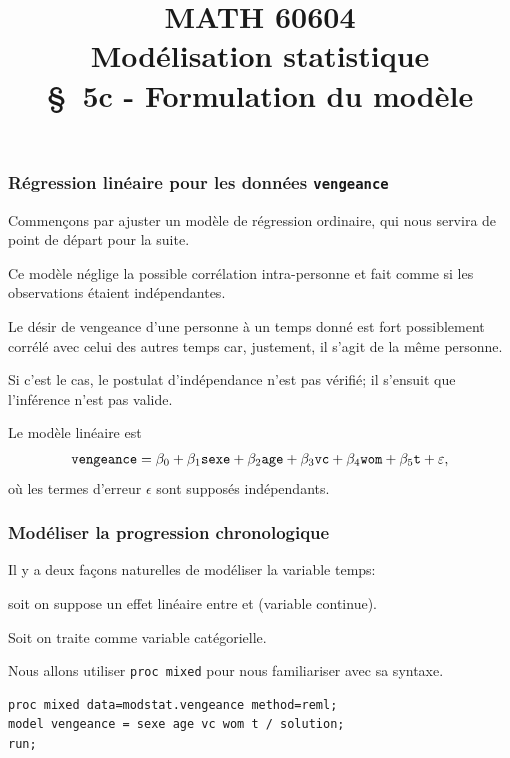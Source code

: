 \documentclass{beamer}
\title[\color{white}{MATH 60604 \S~5c - Formulation du modèle}]{\texorpdfstring{MATH 60604 \\Modélisation statistique \\ \S~5c - Formulation du modèle}{MATH 60604 \\Modélisation statistique \\ \S~5c - Formulation du modèle}}
\author{}
\institute{HEC Montréal\\
Département de sciences de la décision}
\date{}
\begin{document}
\frame{\titlepage}


\begin{frame}[fragile]
\frametitle{Régression linéaire pour les données \texttt{vengeance}}
\bi
\item  Commençons par ajuster un modèle de régression ordinaire, qui nous servira de
point de départ pour la suite. 
\item Ce modèle néglige la possible corrélation intra-personne et fait
comme si les observations étaient indépendantes.
\bi

\item  Le désir de vengeance d'une personne à un temps donné est fort
possiblement corrélé avec celui des autres temps car, justement, il s'agit de la
même personne. 
\item Si c'est le cas, le postulat d'indépendance n'est pas vérifié; il s'ensuit que l'inférence n'est
pas valide.
\ei
\item Le modèle linéaire est
\begin{align*}
\texttt{vengeance} = \beta_0+\beta_1 \texttt{sexe} + \beta_2 \texttt{age} + \beta_3 \texttt{vc} + \beta_4 \texttt{wom} + \beta_5 \texttt{t} + \varepsilon, 
\end{align*}
où les termes d'erreur $\epsilon$ sont supposés indépendants.
\ei
\end{frame}

\begin{frame}[fragile]
\frametitle{Modéliser la progression chronologique}
\bi
\item Il y a deux façons naturelles de modéliser la variable temps:
\bi

\item soit on suppose un effet linéaire entre  et  (variable continue).
\item Soit on traite  comme variable catégorielle. 
\ei

\item  Nous allons utiliser \texttt{proc mixed} pour nous familiariser avec sa syntaxe.
 
\begin{tcolorbox}[colback=white, colframe=hecblue, title=Code SAS pour ajuster un modèle linéaire]
\begin{verbatim}
proc mixed data=modstat.vengeance method=reml;
model vengeance = sexe age vc wom t / solution;
run;
\end{verbatim}
\end{tcolorbox}
\ei
\end{frame}
\end{document}
